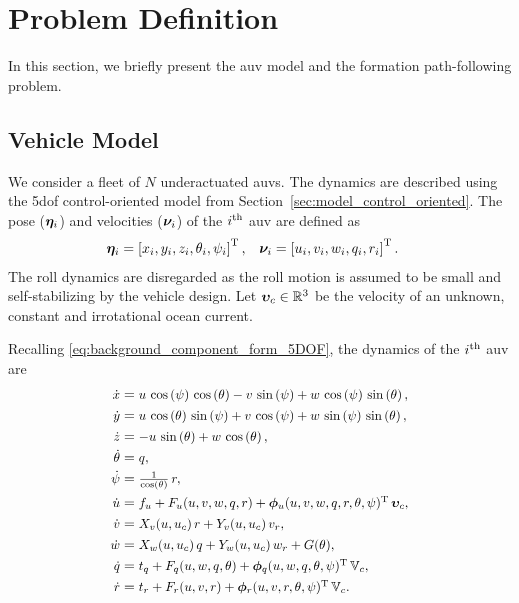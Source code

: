 \section{Problem Definition}
\label{sec:nsb_5dof_model}
In this section, we briefly present the \gls{auv} model and the formation path-following problem.

\subsection{Vehicle Model}
We consider a fleet of $N$ underactuated \glspl{auv}.
The dynamics are described using the 5\gls{dof} control-oriented model from Section~\ref{sec:model_control_oriented}.
The pose ($\bm{\eta}_i$) and velocities ($\bm{\nu}_i$) of the $i^{\rm th}$ \gls{auv} are defined as
\begin{align}
    \bm{\eta}_i &= \left[x_i, y_i, z_i, \theta_i, \psi_i\right]^{\mathrm{T}}, &
    \bm{\nu}_i &= \left[u_i, v_i, w_i, q_i, r_i\right]^{\mathrm{T}}.
\end{align}
The roll dynamics are disregarded as the roll motion is assumed to be small and self-stabilizing by the vehicle design.
Let $\bm{\upsilon}_c \in \mathbb{R}^3$ be the velocity of an unknown, constant and irrotational ocean current.

Recalling \eqref{eq:background_component_form_5DOF}, the dynamics of the $i^{\rm th}$ \gls{auv} are
\begin{subequations}
    \begin{align}
        \scale[0.93]{\dot{x}} &= \scale[0.93]{u\,\cos\left(\psi \right)\,\cos\left(\theta \right)-v\,\sin\left(\psi \right)+w\,\cos\left(\psi \right)\,\sin\left(\theta \right),} \\
        \scale[0.93]{\dot{y}} &= \scale[0.93]{u\,\cos\left(\theta \right)\,\sin\left(\psi \right)+v\,\cos\left(\psi \right)+w\,\sin\left(\psi \right)\,\sin\left(\theta \right),} \\
        \scale[0.93]{\dot{z}} &= \scale[0.93]{-u\,\sin\left(\theta \right)+w\,\cos\left(\theta \right),} \\
        \scale[0.93]{\dot{\theta}} &= \scale[0.93]{q,} \label{eq:nsb_5dof_theta_dot} \\
        \scale[0.93]{\dot{\psi}} &= \scale[0.93]{\frac{1}{\cos\left(\theta \right)}\,r,} \label{eq:nsb_5dof_psi_dot} \\
        \scale[0.93]{\dot{u}} &= \scale[0.93]{f_u + F_u(u, v, w, q, r) + \bs{\phi}_u(u, v, w, q, r, \theta, \psi)\T\,\ocean,} \label{eq:nsb_5dof_u_dot} \\
        \scale[0.93]{\dot{v}} &= \scale[0.93]{X_v(u, u_c)\,r + Y_v(u, u_c)\,v_r,} \\
        \scale[0.93]{\dot{w}} &= \scale[0.93]{X_w(u, u_c)\,q + Y_w(u, u_c)\,w_r + G(\theta),} \\
        \scale[0.93]{\dot{q}} &= \scale[0.93]{t_q + F_q(u, w, q, \theta) + \bs{\phi}_q(u, w, q, \theta, \psi)\T\,\mathbb{V}_c,} \label{eq:nsb_5dof_q_dot} \\
        \scale[0.93]{\dot{r}} &= \scale[0.93]{t_r + F_r(u, v, r) + \bs{\phi}_r(u, v, r, \theta, \psi)\T\,\mathbb{V}_c.} \label{eq:nsb_5dof_r_dot} 
    \end{align} \label{eq:nsb_5dof_components}
\end{subequations}

